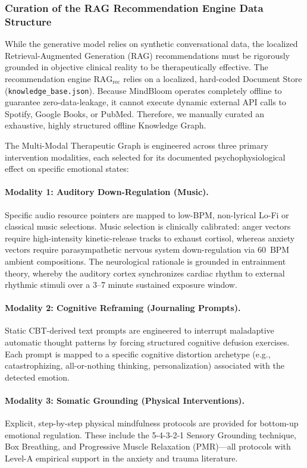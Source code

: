 \documentclass[12pt,twoside]{article}
\begin{document}
\subsubsection{Curation of the RAG Recommendation Engine Data Structure}

While the generative model relies on synthetic conversational data, the localized Retrieval-Augmented Generation (RAG) recommendations must be rigorously grounded in objective clinical reality to be therapeutically effective. The recommendation engine $\text{RAG}_{\text{rec}}$ relies on a localized, hard-coded Document Store (\texttt{knowledge\_base.json}). Because MindBloom operates completely offline to guarantee zero-data-leakage, it cannot execute dynamic external API calls to Spotify, Google Books, or PubMed. Therefore, we manually curated an exhaustive, highly structured offline Knowledge Graph.

The Multi-Modal Therapeutic Graph is engineered across three primary intervention modalities, each selected for its documented psychophysiological effect on specific emotional states:

\paragraph{Modality 1: Auditory Down-Regulation (Music).}
Specific audio resource pointers are mapped to low-BPM, non-lyrical Lo-Fi or classical music selections. Music selection is clinically calibrated: anger vectors require high-intensity kinetic-release tracks to exhaust cortisol, whereas anxiety vectors require parasympathetic nervous system down-regulation via 60~BPM ambient compositions. The neurological rationale is grounded in entrainment theory, whereby the auditory cortex synchronizes cardiac rhythm to external rhythmic stimuli over a 3--7 minute sustained exposure window.

\paragraph{Modality 2: Cognitive Reframing (Journaling Prompts).}
Static CBT-derived text prompts are engineered to interrupt maladaptive automatic thought patterns by forcing structured cognitive defusion exercises. Each prompt is mapped to a specific cognitive distortion archetype (e.g., catastrophizing, all-or-nothing thinking, personalization) associated with the detected emotion.

\paragraph{Modality 3: Somatic Grounding (Physical Interventions).}
Explicit, step-by-step physical mindfulness protocols are provided for bottom-up emotional regulation. These include the 5-4-3-2-1 Sensory Grounding technique, Box Breathing, and Progressive Muscle Relaxation (PMR)---all protocols with Level-A empirical support in the anxiety and trauma literature.
\end{document}
